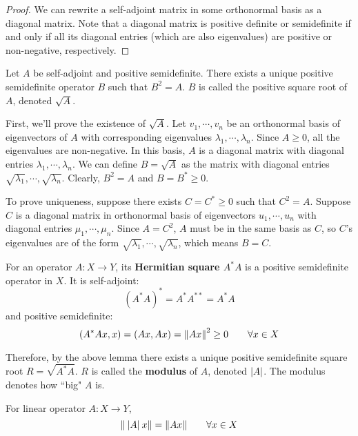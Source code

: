 \begin{proof}
We can rewrite a self-adjoint matrix in some orthonormal basis as a diagonal matrix. Note that a diagonal matrix is positive definite or semidefinite if and only if all its diagonal entries (which are also eigenvalues) are positive or non-negative, respectively.  
\end{proof}

\begin{lemma}
Let $A$ be self-adjoint and positive semidefinite. There exists a unique positive semidefinite operator $B$ such that $B^{2} = A$. $B$ is called the positive square root of $A$, denoted $\sqrt{A}$.
\end{lemma}

\begin{lproof}
First, we'll prove the existence of $\sqrt{A}$. Let $v_{1}, \cdots, v_{n}$ be an orthonormal basis of eigenvectors of $A$ with corresponding eigenvalues $\lambda_{1}, \cdots, \lambda_{n}$. Since $A \geq 0$, all the eigenvalues are non-negative. In this basis, $A$ is a diagonal matrix with diagonal entries $\lambda_{1}, \cdots, \lambda_{n}$. We can define $B =\sqrt{A}$ as the matrix with diagonal entries $\sqrt{\lambda_{1}}, \cdots, \sqrt{\lambda_{n}}$. Clearly, $B^{2} = A$ and $B = B^{*} \geq 0$. 

To prove uniqueness, suppose there exists $C = C^{*} \geq 0$ such that $C^{2} = A$. Suppose $C$ is a diagonal matrix in orthonormal basis of eigenvectors $u_{1}, \cdots, u_{n}$ with diagonal entries $\mu_{1}, \cdots, \mu_{n}$. Since $A = C^{2}$, $A$ must be in the same basis as $C$, so $C$'s eigenvalues are of the form $\sqrt{\lambda_{1}}, \cdots, \sqrt{\lambda_{n}}$, which means $B = C$. 
\end{lproof}

\begin{definition}
For an operator $A: X \rightarrow Y$, its \textbf{Hermitian square $A^{*} A$} is a positive semidefinite operator in $X$. It is self-adjoint:
$$(A^{*} A)^{*} = A^{*} A^{**} = A^{*} A$$
and positive semidefinite:
$$(A^{*} Ax, x) = (Ax, Ax) = \norm{Ax}^{2} \geq 0 \qquad \forall x \in X$$

Therefore, by the above lemma there exists a unique positive semidefinite square root $R = \sqrt{A^{*} A}$. $R$ is called the \textbf{modulus} of $A$, denoted $\abs{A}$. The modulus denotes how ``big" $A$ is. 
\end{definition}

\begin{theorem}
For linear operator $A: X \rightarrow Y$, 
$$\norm{\: \abs{A} \: x} = \norm{Ax} \qquad \forall x \in X$$ 
\end{theorem}

